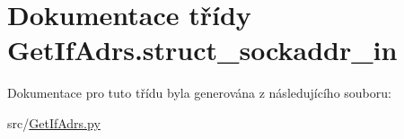 \hypertarget{classGetIfAdrs_1_1struct__sockaddr__in}{\section{Dokumentace třídy Get\-If\-Adrs.\-struct\-\_\-sockaddr\-\_\-in}
\label{d8/d99/classGetIfAdrs_1_1struct__sockaddr__in}
}


Dokumentace pro tuto třídu byla generována z následujícího souboru\-:\begin{DoxyCompactItemize}
\item 
src/\hyperlink{GetIfAdrs_8py}{Get\-If\-Adrs.\-py}\end{DoxyCompactItemize}
